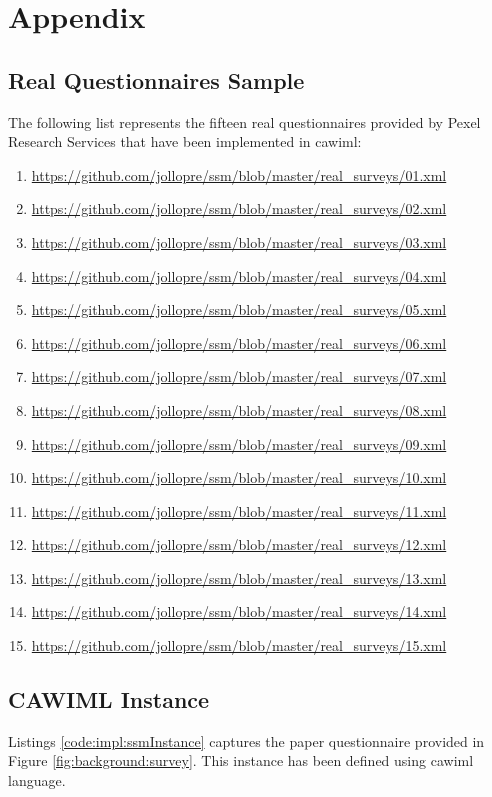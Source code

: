 \chapter{Appendix}\label{ch:appendix}

	\section{Real Questionnaires Sample}\label{sec:appendix:questionnaires}

	The following list represents the fifteen real questionnaires provided by Pexel Research Services that have been implemented in \gls{cawiml}:

	\begin{enumerate}
		\item \url{https://github.com/jollopre/ssm/blob/master/real_surveys/01.xml}
		\item \url{https://github.com/jollopre/ssm/blob/master/real_surveys/02.xml}
		\item \url{https://github.com/jollopre/ssm/blob/master/real_surveys/03.xml}
		\item \url{https://github.com/jollopre/ssm/blob/master/real_surveys/04.xml}
		\item \url{https://github.com/jollopre/ssm/blob/master/real_surveys/05.xml}
		\item \url{https://github.com/jollopre/ssm/blob/master/real_surveys/06.xml}
		\item \url{https://github.com/jollopre/ssm/blob/master/real_surveys/07.xml}
		\item \url{https://github.com/jollopre/ssm/blob/master/real_surveys/08.xml}
		\item \url{https://github.com/jollopre/ssm/blob/master/real_surveys/09.xml}
		\item \url{https://github.com/jollopre/ssm/blob/master/real_surveys/10.xml}
		\item \url{https://github.com/jollopre/ssm/blob/master/real_surveys/11.xml}
		\item \url{https://github.com/jollopre/ssm/blob/master/real_surveys/12.xml}
		\item \url{https://github.com/jollopre/ssm/blob/master/real_surveys/13.xml}
		\item \url{https://github.com/jollopre/ssm/blob/master/real_surveys/14.xml}
		\item \url{https://github.com/jollopre/ssm/blob/master/real_surveys/15.xml}
	\end{enumerate}

	\section{CAWIML Instance}\label{sec:appendix:ssmInstance}

	Listings \ref{code:impl:ssmInstance} captures the paper questionnaire provided in Figure \ref{fig:background:survey}. This instance has been defined using \gls{cawiml} language.
	





